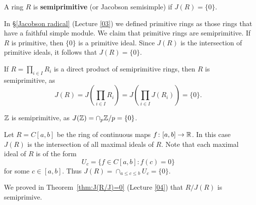 
\begin{definition}
	A ring $R$ is \textbf{semiprimitive} (or Jacobson semisimple) if  $J(R)=\{0\}$.
\end{definition}

In \S\ref{Jacobson radical} (Lecture \ref{03}) we defined primitive rings as
those rings that have a faithful simple module.  We claim that primitive rings
are semiprimitive. If $R$ is primitive, then $\{0\}$ is a primitive ideal. Since
$J(R)$ is the intersection of primitive ideals, it follows that $J(R)=\{0\}$.

\begin{example}
	If $R=\prod_{i\in I}R_i$ is a direct product of semiprimitive rings, then
	$R$ is semiprimitive, as 
	\[
		J(R)=J\left(\prod_{i\in I}R_i\right)=J\left(\prod_{i\in I}J(R_i)\right)=\{0\}.
	\]
\end{example}

\begin{example}
$\mathbb{Z}$ is semiprimitive, as $J(\mathbb{Z})=\cap_{p}\mathbb{Z}/p=\{0\}$.
\end{example}

\begin{example}
	\label{exa:C[a,b]}
	Let $R=C[a,b]$ be the ring of continuous maps $f\colon [a,b]\to\mathbb{R}$. 
	In this case $J(R)$ is the intersection of all maximal ideals of $R$. Note that 
	each maximal ideal of $R$ is of the form 
	\[
		U_c=\{f\in C[a,b]:f(c)=0\}
	\]
	for some $c\in[a,b]$. 
	Thus $J(R)=\cap_{a\leq c\leq
	b}U_c=\{0\}$.
\end{example}

We proved in Theorem~\ref{thm:J(R/J)=0} (Lecture \ref{04}) 
that $R/J(R)$ is semiprimive. 

%
%


